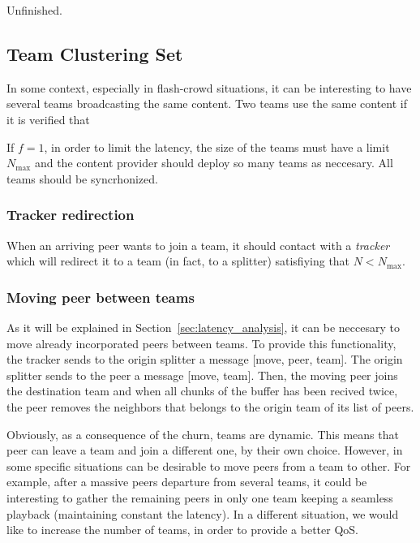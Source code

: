 
\begin{notex}
  Unfinished.
\end{notex}

\subsection{Team Clustering Set}
In some context, especially in flash-crowd situations, it can be
interesting to have several teams broadcasting the same content. Two
teams use the same content if it is verified that 

If $f=1$, in order to limit the latency, the size of the teams must
have a limit $N_\text{max}$ and the content provider should deploy so
many teams as neccesary. All teams should be syncrhonized.

\subsubsection{Tracker redirection}
When an arriving peer wants to join a team, it should contact with a
\emph{tracker} which will redirect it to a team (in fact, to a
splitter) satisfiying that $N<N_\text{max}$.

\subsubsection{Moving peer between teams}
As it will be explained in Section~\ref{sec:latency_analysis}, it can
be neccesary to move already incorporated peers between teams. To
provide this functionality, the tracker sends to the origin splitter a
message [move, peer, team]. The origin splitter sends to the peer a
message [move, team]. Then, the moving peer joins the destination team
and when all chunks of the buffer has been recived twice, the peer
removes the neighbors that belongs to the origin team of its list of
peers.


Obviously, as a consequence of the churn, teams are dynamic. This
means that peer can leave a team and join a different one, by their
own choice. However, in some specific situations can be desirable to
move peers from a team to other. For example, after a massive peers
departure from several teams, it could be interesting to gather the
remaining peers in only one team keeping a seamless playback
(maintaining constant the latency). In a different situation, we would
like to increase the number of teams, in order to provide a better
QoS.

